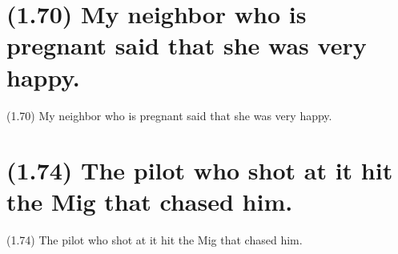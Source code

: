 \documentclass{article}
\begin{document}
\clearpage

%
%

\section*{(1.70) My neighbor who is pregnant said that she was very happy.}

\bigbreak
\begin{enumerate*}
\item[(1.70)] My neighbor who is pregnant said that she was very happy.
\end{enumerate*}
\bigbreak

\bigbreak
\begin{minipage}{\textwidth}
\end{minipage}
\bigbreak

\clearpage

%
%

\section*{(1.74) The pilot who shot at it hit the Mig that chased him.}

\bigbreak
\begin{enumerate*}
\item[(1.74)] The pilot who shot at it hit the Mig that chased him.
\end{enumerate*}
\bigbreak

\bigbreak
\begin{minipage}{\textwidth}
\end{minipage}
\bigbreak
\end{document}
